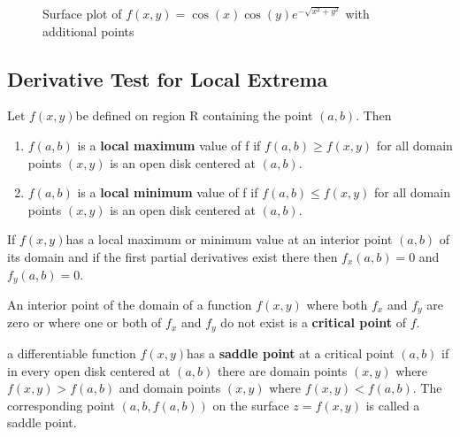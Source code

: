 \documentclass[12pt,a4paper]{article}
\newenvironment{definition}{\begin{definitionbox}}{\end{definitionbox}\vspace{1\baselineskip}}
\newenvironment{theorem}{\begin{theorembox}}{\end{theorembox}\vspace{1\baselineskip}}
\newcommand{\fxy}{\(f(x,y)\)}
\begin{document}
\begin{figure}[h]
    \centering
    \caption{Surface plot of $f(x,y) = \cos(x)\cos(y)e^{-\sqrt{x^2 + y^2}}$ with additional points}
\end{figure}


\subsection{Derivative Test for Local Extrema}

\begin{definition}
    Let \fxy be defined on region R containing the point \((a,b)\). Then
    \begin{enumerate}
        \item \(f(a,b)\) is a \textbf{local maximum} value of f if \(f(a,b) \geq f(x,y)\) for all domain points \((x,y)\) is an open disk centered at \((a,b)\).
        \item \(f(a,b)\) is a \textbf{local minimum} value of f if \(f(a,b) \leq f(x,y)\) for all domain points \((x,y)\) is an open disk centered at \((a,b)\).
    \end{enumerate}
\end{definition}


\begin{theorem}
    If \fxy has a local maximum or minimum value at an interior point \((a,b)\) of its domain and if the first partial derivatives exist there then \(f_x(a,b)=0\) and  \(f_y(a,b)=0\).
\end{theorem}


\begin{definition}
    An interior point of the domain of a function \(f(x,y)\) where both \(f_x\) and  \(f_y\) are zero or where one or both of \(f_x\) and  \(f_y\) do not exist is a \textbf{critical point } of \(f\).
\end{definition}


\begin{definition}
    a differentiable function \fxy has a \textbf{saddle point} at a critical point \((a,b)\) if in every open disk centered at \((a,b)\) there are domain points \((x,y)\) where \(f(x,y) > f(a,b)\) and domain points \((x,y)\) where \(f(x,y) < f(a,b)\). The corresponding point \((a, b, f(a,b))\) on the surface \(z = f(x,y)\) is called a saddle point.
\end{definition}
\end{document}
